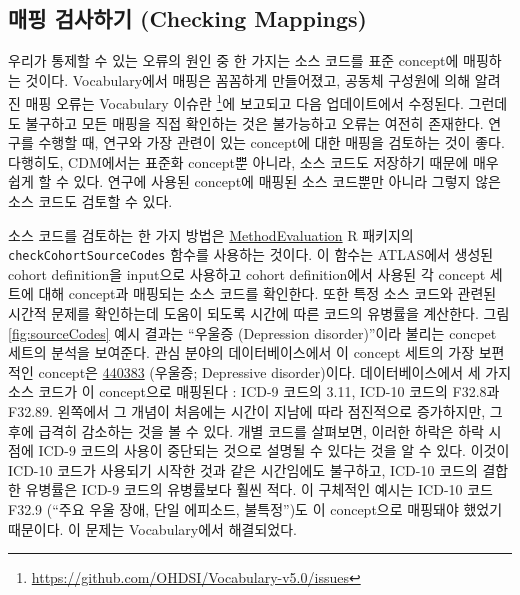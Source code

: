 \documentclass[11pt]{book}
\let\rmarkdownfootnote\footnote%
\def\footnote{\protect\rmarkdownfootnote}
\theoremstyle{definition}
\theoremstyle{definition}
\theoremstyle{definition}
\theoremstyle{remark}
\begin{document}
\subsection{매핑 검사하기 (Checking
Mappings)}\label{--checking-mappings}

우리가 통제할 수 있는 오류의 원인 중 한 가지는 소스 코드를 표준
concept에 매핑하는 것이다. Vocabulary에서 매핑은 꼼꼼하게 만들어졌고,
공동체 구성원에 의해 알려진 매핑 오류는 Vocabulary 이슈란 \footnote{\url{https://github.com/OHDSI/Vocabulary-v5.0/issues}}에
보고되고 다음 업데이트에서 수정된다. 그런데도 불구하고 모든 매핑을 직접
확인하는 것은 불가능하고 오류는 여전히 존재한다. 연구를 수행할 때,
연구와 가장 관련이 있는 concept에 대한 매핑을 검토하는 것이 좋다.
다행히도, CDM에서는 표준화 concept뿐 아니라, 소스 코드도 저장하기 때문에
매우 쉽게 할 수 있다. 연구에 사용된 concept에 매핑된 소스 코드뿐만
아니라 그렇지 않은 소스 코드도 검토할 수 있다.

소스 코드를 검토하는 한 가지 방법은
\href{https://ohdsi.github.io/MethodEvaluation/}{MethodEvaluation} R
패키지의 \texttt{checkCohortSourceCodes} 함수를 사용하는 것이다. 이
함수는 ATLAS에서 생성된 cohort definition을 input으로 사용하고 cohort
definition에서 사용된 각 concept 세트에 대해 concept과 매핑되는 소스
코드를 확인한다. 또한 특정 소스 코드와 관련된 시간적 문제를 확인하는데
도움이 되도록 시간에 따른 코드의 유병률을 계산한다. 그림
\ref{fig:sourceCodes} 예시 결과는 ``우울증 (Depression disorder)''이라
불리는 concpet 세트의 분석을 보여준다. 관심 분야의 데이터베이스에서 이
concept 세트의 가장 보편적인 concept은
\href{http://athena.ohdsi.org/search-terms/terms/440383}{440383}
(우울증; Depressive disorder)이다. 데이터베이스에서 세 가지 소스 코드가
이 concept으로 매핑된다 : ICD-9 코드의 3.11, ICD-10 코드의 F32.8과
F32.89. 왼쪽에서 그 개념이 처음에는 시간이 지남에 따라 점진적으로
증가하지만, 그 후에 급격히 감소하는 것을 볼 수 있다. 개별 코드를
살펴보면, 이러한 하락은 하락 시점에 ICD-9 코드의 사용이 중단되는 것으로
설명될 수 있다는 것을 알 수 있다. 이것이 ICD-10 코드가 사용되기 시작한
것과 같은 시간임에도 불구하고, ICD-10 코드의 결합한 유병률은 ICD-9
코드의 유병률보다 훨씬 적다. 이 구체적인 예시는 ICD-10 코드 F32.9
(``주요 우울 장애, 단일 에피소드, 불특정'')도 이 concept으로 매핑돼야
했었기 때문이다. 이 문제는 Vocabulary에서 해결되었다.
\end{document}
